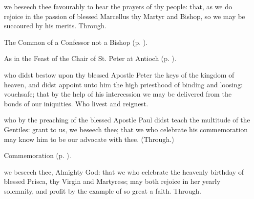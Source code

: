 \memorialCollect
{} we beseech thee favourably to hear the prayers of thy people: that, as we do rejoice in the passion of blessed Marcellus thy Martyr and Bishop, so we may be succoured by his merits. Through.



\begin{rubric}
	The Common of a Confessor not a Bishop (p. \pageref{AbbotCollect}).
\end{rubric}


\clearpage
{}

\begin{rubric}
	As in the Feast of the Chair of St. Peter at Antioch (p. \pageref{CathedraAntioch}).
\end{rubric}

{} who didst bestow upon thy blessed Apostle Peter the keys of the kingdom of heaven, and didst appoint unto him the high priesthood of binding and loosing: vouchsafe; that by the help of his intercession we may be delivered from the bonds of our iniquities. Who livest and reignest.

 who by the preaching of the blessed Apostle Paul didst teach the multitude of the Gentiles: grant to us, we beseech thee; that we who celebrate his commemoration may know him to be our advocate with thee. (Through.)

\begin{rubric}
    Commemoration  (p. \pageref{PriscaCollect}).
\end{rubric}




\memorialCollect\label{PriscaCollect}
 we beseech thee, Almighty God: that we who celebrate the heavenly birthday of blessed Prisca, thy Virgin and Martyress; may both rejoice in her yearly solemnity, and profit by the example of so great a faith. Through.


